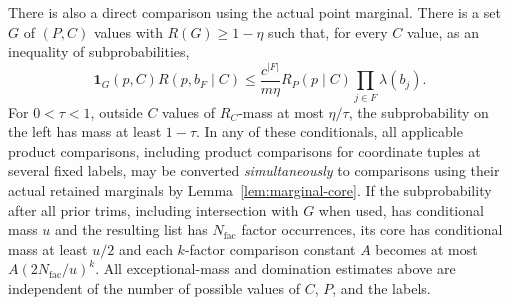\begin{theorem}
There is also a direct comparison using the actual point marginal.
There is a set $G$ of $(P,C)$ values with $R(G)\ge1-\eta$ such that,
for every $C$ value, as an inequality of subprobabilities,
\begin{equation}
 \boldsymbol1_G(p,C)R(p,b_F\mid C)
 \le\frac{c^{|F|}}{m\eta}R_P(p\mid C)
                             \prod_{j\in F}\lambda(b_j).
 \label{eq:actual-point-free}
\end{equation}
For $0<\tau<1$, outside $C$ values of $R_C$-mass at most
$\eta/\tau$, the subprobability on the left has mass at least
$1-\tau$.  In any of these conditionals, all applicable product
comparisons, including product comparisons for coordinate tuples at
several fixed labels, may be converted \emph{simultaneously} to
comparisons using their actual retained marginals by
Lemma~\ref{lem:marginal-core}.  If the subprobability after all prior trims, including intersection
with $G$ when used, has conditional mass $u$ and the resulting list has
$N_{\mathrm{fac}}$ factor occurrences, its core has conditional mass
at least $u/2$ and each $k$-factor comparison constant $A$ becomes at
most $A(2N_{\mathrm{fac}}/u)^k$.
All exceptional-mass and domination estimates above are independent
of the number of possible values of $C$, $P$, and the labels.
\end{theorem}

